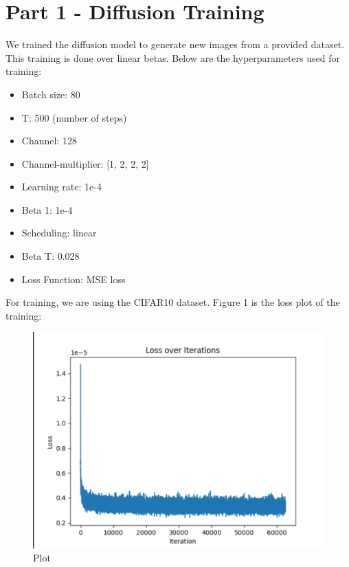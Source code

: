 \documentclass[conference]{IEEEtran}
\begin{document}




\maketitle




\IEEEpeerreviewmaketitle

\section{Part 1 - Diffusion Training}
We trained the diffusion model to generate new images from a provided dataset. This training is done over linear betas.
Below are the hyperparameters used for training:
\begin{itemize}
  \item Batch size: 80
  \item T: 500 (number of steps)
  \item Channel: 128
  \item Channel-multiplier: [1, 2, 2, 2]
  \item Learning rate: 1e-4
  \item Beta 1: 1e-4
  \item Scheduling: linear
  \item Beta T: 0.028
  \item Loss Function: MSE loss
\end{itemize}

For training, we are using the CIFAR10 dataset.
Figure 1 is the loss plot of the training:
\begin{figure}[!h]
  \centering
  \includegraphics[scale=0.2]{./images/linearloss.png}
  \caption{Plot}
\end{figure} 
\end{document}
